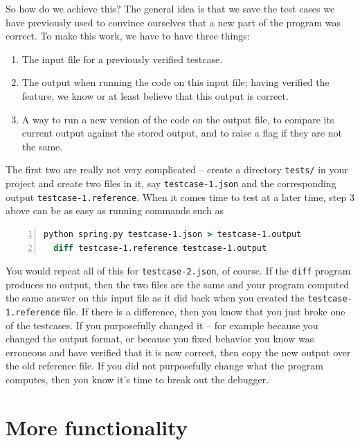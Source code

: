 \documentclass{article}
\begin{document}
So how do we achieve this? The general idea is that we save the test cases we
have previously used to convince ourselves that a new part of the program was
correct. To make this work, we have to have three things:
\begin{enumerate}
\item The input file for a previously verified testcase.
\item The output when running the code on this input file; having verified the
  feature, we know or at least believe that this output is correct.
\item A way to run a new version of the code on the output file, to compare
  its current output against the stored output, and to raise a flag if they
  are not the same.
\end{enumerate}
The first two are really not very complicated -- create a directory
\texttt{tests/} in your project and create two files in it, say
\texttt{testcase-1.json} and the corresponding output
\texttt{testcase-1.reference}. When it comes time to test at a later time, step 3
above can be as easy as running commands such as
\begin{lstlisting}[frame=single,basicstyle=\footnotesize,numbers=left,language=csh]
  python spring.py testcase-1.json > testcase-1.output
  diff testcase-1.reference testcase-1.output
\end{lstlisting}
You would repeat all of this for \texttt{testcase-2.json}, of course.
If the \texttt{diff} program produces no output, then the two files are the
same and your program computed the same answer on this input file as it did
back when you created the \texttt{testcase-1.reference} file. If there is a
difference, then you know that you just broke one of the testcases. If you
purposefully changed it -- for example because you changed the output format,
or because you fixed behavior you know was erroneous and have verified that it
is now correct, then copy the new output over the old reference file. If you did not
purposefully change what the program computes, then you know it's time to break out the debugger.


\section{More functionality}
\label{sec:extending}
\end{document}
